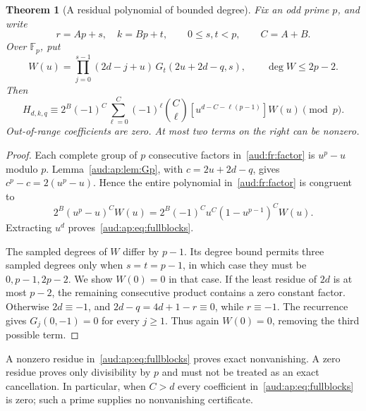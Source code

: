 \documentclass[11pt,a4paper]{article}
\numberwithin{equation}{section}
\newtheorem{theorem}{Theorem}[section]
\begin{document}
\begin{theorem}[A residual polynomial of bounded degree]\label{aud:ap:thm:blocks}
Fix an odd prime $p$, and write
\[
 r=Ap+s,\quad k=Bp+t,\qquad0\le s,t<p,\qquad C=A+B.
\]
Over $\mathbb F_p$, put
\[
 W(u)=\prod_{j=0}^{s-1}(2d-j+u)\,G_t(2u+2d-q,s),
 \qquad\deg W\le2p-2.
\]
Then
\begin{equation}\label{aud:ap:eq:fullblocks}
 H_{d,k,q}\equiv2^B(-1)^C\sum_{\ell=0}^{C}(-1)^\ell\binom C\ell
 [u^{d-C-\ell(p-1)}]W(u)\pmod p.
\end{equation}
Out-of-range coefficients are zero. At most two terms on the right can be nonzero.
\end{theorem}
\begin{proof}
Each complete group of $p$ consecutive factors in~\eqref{aud:fr:factor} is $u^p-u$ modulo $p$. Lemma~\ref{aud:ap:lem:Gp}, with $c=2u+2d-q$, gives $c^p-c=2(u^p-u)$. Hence the entire polynomial in~\eqref{aud:fr:factor} is congruent to
\[
 2^B(u^p-u)^C W(u)
 =2^B(-1)^C u^C(1-u^{p-1})^C W(u).
\]
Extracting $u^d$ proves~\eqref{aud:ap:eq:fullblocks}.

The sampled degrees of $W$ differ by $p-1$. Its degree bound permits three sampled degrees only when $s=t=p-1$, in which case they must be $0,p-1,2p-2$. We show $W(0)=0$ in that case. If the least residue of $2d$ is at most $p-2$, the remaining consecutive product contains a zero constant factor. Otherwise $2d\equiv-1$, and $2d-q=4d+1-r\equiv0$, while $r\equiv-1$. The recurrence gives $G_j(0,-1)=0$ for every $j\ge1$. Thus again $W(0)=0$, removing the third possible term.
\end{proof}
A nonzero residue in~\eqref{aud:ap:eq:fullblocks} proves exact nonvanishing. A zero residue proves only divisibility by $p$ and must not be treated as an exact cancellation. In particular, when $C>d$ every coefficient in~\eqref{aud:ap:eq:fullblocks} is zero; such a prime supplies no nonvanishing certificate.
\end{document}
